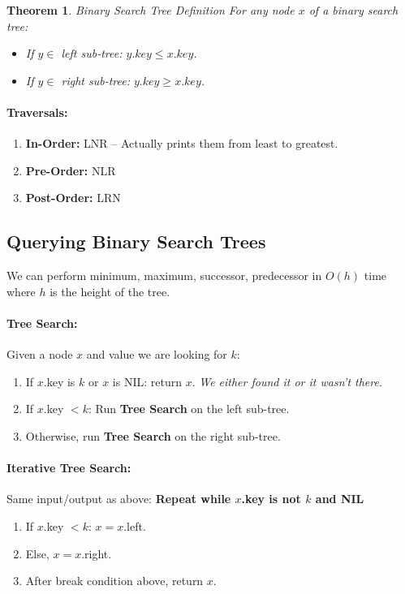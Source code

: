 \documentclass[a4paper,12pt]{report}
\newtheorem{theorem}{Theorem}
\begin{document}
\begin{theorem}{Binary Search Tree Definition}
For any node $x$ of a binary search tree: 
\begin{itemize}
\item If $y\in $ left sub-tree: $y.key \leq x.key$.
\item If $y\in $ right sub-tree: $y.key \geq x.key$.
\end{itemize}
\end{theorem}


\paragraph{Traversals: } 
\begin{enumerate}
\item \textbf{In-Order: } LNR -- Actually prints them from least to greatest.
\item \textbf{Pre-Order: } NLR
\item \textbf{Post-Order: } LRN
\end{enumerate}


\subsection{Querying Binary Search Trees}

We can perform minimum, maximum, successor, predecessor in $O(h)$ time where $h$ is the height of the tree.

\paragraph{Tree Search: } Given a node $x$ and value we are looking for $k$:
\begin{enumerate}
\item If $x$.key is $k$ or $x$ is NIL: return $x$. \textit{We either found it or it wasn't there}.
\item If $x$.key $< k$: Run \textbf{Tree Search} on the left sub-tree.
\item Otherwise, run \textbf{Tree Search} on the right sub-tree.
\end{enumerate}

\paragraph{Iterative Tree Search: } Same input/output as above: \textbf{Repeat while $x$.key is not $k$ and NIL} 
\begin{enumerate}
\item If $x$.key $<k$: $x = x$.left.
\item Else, $x = x$.right.
\item After break condition above, return $x$.
\end{enumerate}
\end{document}
